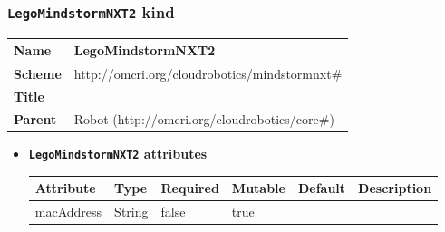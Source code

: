 \subsubsection{\texttt{LegoMindstormNXT2} kind}
\begin{center}
\begin{tabular}{|l|l|}
  \hline
  \textbf{Name} & LegoMindstormNXT2 \\
  \hline  
  \textbf{Scheme} & http://omcri.org/cloudrobotics/mindstormnxt\# \\
  \hline
  \textbf{Title} &  \\
  \hline
  \textbf{Parent} & Robot (http://omcri.org/cloudrobotics/core\#) \\
  \hline
\end{tabular}
\end{center}
\begin{itemize}
\item \textbf{\texttt{LegoMindstormNXT2} attributes}

\begin{tabularx}{\textwidth}{|l|l|p{1.4cm}|p{1.3cm}|l|X|}
  \hline
  \textbf{Attribute} & \textbf{Type} & \textbf{Required} & \textbf{Mutable} & \textbf{Default} & \textbf{Description} \\
  \hline  
  macAddress & String & false & true &  &  \\
  \hline
\end{tabularx}
\end{itemize}



